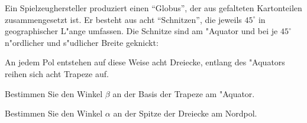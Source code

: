 Ein Spielzeughersteller produziert einen ``Globus'', der aus gefalteten
Kartonteilen zusammengesetzt ist. Er besteht aus acht ``Schnitzen'',
die jeweils $45^\circ$ in geographischer L"ange umfassen. Die Schnitze
sind am "Aquator und bei je $45^\circ$ n"ordlicher und s"udlicher Breite
geknickt:
\begin{center}
\end{center}
An jedem Pol entstehen auf diese Weise acht Dreiecke, entlang des
"Aquators reihen sich acht Trapeze auf.
\begin{teilaufgaben}
\item
Bestimmen Sie den Winkel $\beta$ an der Basis der Trapeze am "Aquator.
\item Bestimmen Sie den Winkel $\alpha$ an der Spitze der Dreiecke am Nordpol.
\end{teilaufgaben}

